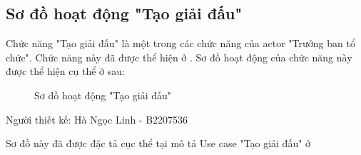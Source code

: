 \subsection{Sơ đồ hoạt động "Tạo giải đấu"}
\setcounter{figure}{0}

Chức năng "Tạo giải đấu" là một trong các chức năng của actor "Trưởng ban tổ chức".
Chức năng này đã được thể hiện ở .
Sơ đồ hoạt động của chức năng này được thể hiện cụ thể ở  sau:

\begin{figure}[H]
  \centering
  
  \caption{Sơ đồ hoạt động "Tạo giải đấu"}
  \label{fig:at-1}
\end{figure}

Người thiết kế: Hà Ngọc Linh - B2207536

Sơ đồ này đã được đặc tả cục thể tại mô tả Use case "Tạo giải đấu" ở

